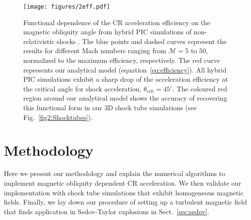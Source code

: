 \documentclass[8pt,a4paper,usenatbib]{mnras}
\newcommand{\mach}{\mathcal{M}}
\begin{document}
\begin{figure}
\label{fig:1}
\begin{center}
\texttt{[image: figures/2eff.pdf]} 
\end{center}
\caption{Functional dependence of the CR acceleration efficiency on the magnetic
  obliquity angle from hybrid PIC simulations of non-relativistic shocks
  \citep{2014ApJ...783...91C}. The blue points and dashed curves represent the
  results for different Mach numbers ranging from $\mach = 5$ to $50$,
  normalized to the maximum efficiency, respectively. The red curve represents
  our analytical model (equation~\ref{eq:efficiency}). All hybrid PIC
  simulations exhibit a sharp drop of the acceleration efficiency at the
  critical angle for shock acceleration, $\theta_{\mathrm{crit}} =
  45^\circ$. The coloured red region around our analytical model shows the
  accuracy of recovering this functional form in our 3D shock tube simulations
  (see Fig.~\ref{fig2:Shocktubes}).}
\label{fig1:efficiency}
\end{figure}

\section{Methodology}
\label{sec:method}

Here we present our methodology and explain the numerical algorithms to
implement magnetic obliquity dependent CR acceleration. We then validate our
implementation with shock tube simulations that exhibit homogeneous magnetic
fields. Finally, we lay down our procedure of setting up a turbulent magnetic
field that finds application in Sedov-Taylor explosions in
Sect.~\ref{sec:sedov}.
\end{document}
